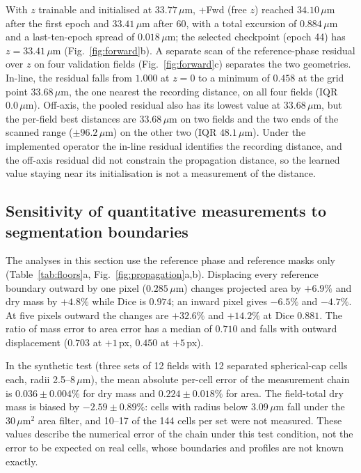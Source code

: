 \documentclass[11pt]{article}
\begin{document}
With $z$ trainable and initialised at $33.77\,\mu$m, +Fwd (free $z$) reached
$34.10\,\mu$m after the first epoch and $33.41\,\mu$m after 60, with a total
excursion of $0.884\,\mu$m and a last-ten-epoch spread of $0.018\,\mu$m; the
selected checkpoint (epoch 44) has $z=33.41\,\mu$m (Fig.~\ref{fig:forward}b).
A separate scan of the reference-phase residual over $z$ on four validation
fields (Fig.~\ref{fig:forward}c) separates the two geometries. In-line, the
residual falls from $1.000$ at $z=0$ to a minimum of $0.458$ at the grid point
$33.68\,\mu$m, the one nearest the recording distance, on all four fields (IQR
$0.0\,\mu$m). Off-axis, the pooled residual also has its lowest value at
$33.68\,\mu$m, but the per-field best distances are $33.68\,\mu$m on two fields
and the two ends of the scanned range ($\pm96.2\,\mu$m) on the other two (IQR
$48.1\,\mu$m). Under the implemented operator the in-line residual identifies
the recording distance, and the off-axis residual did not constrain the
propagation distance, so the learned value staying near its initialisation is
not a measurement of the distance.

\subsection{Sensitivity of quantitative measurements to segmentation boundaries}
\label{sec:res-boundary}

The analyses in this section use the reference phase and reference masks only
(Table~\ref{tab:floors}a, Fig.~\ref{fig:propagation}a,b). Displacing every
reference boundary outward by one pixel ($0.285\,\mu$m) changes projected area
by $+6.9\%$ and dry mass by $+4.8\%$ while Dice is $0.974$; an inward pixel
gives $-6.5\%$ and $-4.7\%$. At five pixels outward the changes are $+32.6\%$
and $+14.2\%$ at Dice $0.881$. The ratio of mass error to area error has a
median of $0.710$ and falls with outward displacement ($0.703$ at $+1$\,px,
$0.450$ at $+5$\,px).



In the synthetic test (three sets of 12 fields with 12 separated spherical-cap
cells each, radii 2.5--8\,$\mu$m), the mean absolute per-cell error of the
measurement chain is $0.036\pm0.004\%$ for dry mass and $0.224\pm0.018\%$ for
area. The field-total dry mass is biased by $-2.59\pm0.89\%$: cells with radius
below $3.09\,\mu$m fall under the 30\,$\mu$m$^2$ area filter, and 10--17 of the
144 cells per set were not measured. These values describe the numerical error
of the chain under this test condition, not the error to be expected on real
cells, whose boundaries and profiles are not known exactly.
\end{document}
